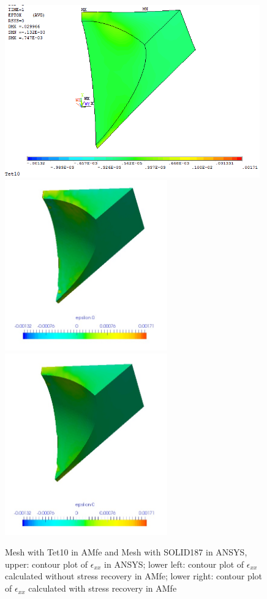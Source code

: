 \begin{figure}[htbp]
	\begin{center}
		\includegraphics[width=11cm,clip]{Tet10_Exx.png}
		\includegraphics[width=7cm,clip]{Tet10_Exx_PD.png}  		
		\includegraphics[width=7cm,clip]{Tet10_Exx_P.png} 		
		\caption{Mesh with Tet10 in AMfe and Mesh with SOLID187 in ANSYS, upper: contour plot of $\epsilon_{xx}$ in ANSYS; lower left: contour plot of $\epsilon_{xx}$ calculated without stress recovery in AMfe; lower right: contour plot of $\epsilon_{xx}$ calculated with stress recovery in AMfe} \label{fig: Tet10_Exx}
	\end{center}
\end{figure}
\clearpage 

